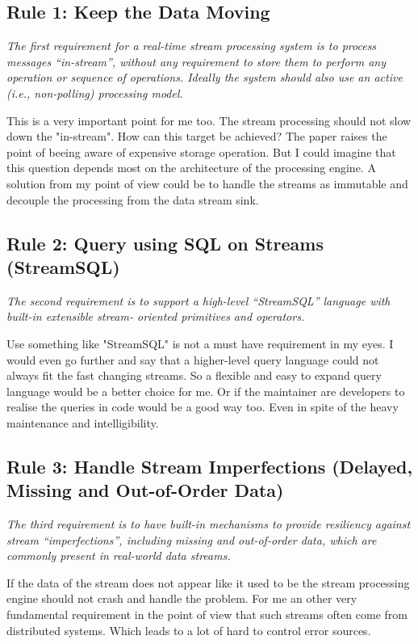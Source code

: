 \subsection{Rule 1: Keep the Data Moving}
\textit{The first requirement for a real-time stream processing
        system is to process messages “in-stream”, without any
        requirement to store them to perform any operation or
        sequence of operations. Ideally the system should also use
        an active (i.e., non-polling) processing model.}

\medskip
This is a very important point for me too. The stream processing should not slow down the "in-stream".
How can this target be achieved? The paper raises the point of beeing  aware of expensive storage operation.
But I could imagine that this question depends most on the architecture of the processing engine.
A solution from my point of view could be to handle the streams as immutable and decouple the processing from the data stream sink.


\subsection{Rule 2: Query using SQL on Streams (StreamSQL)}
\textit{The second requirement is to support a high-level
        “StreamSQL” language with built-in extensible stream-
        oriented primitives and operators.}

\medskip
Use something like "StreamSQL" is not a must have requirement in my eyes.
I would even go further and say that a higher-level query language could not always fit the fast changing streams.
So a flexible and easy to expand query language would be a better choice for me.
Or if the maintainer are developers to realise the queries in code would be a good way too.
Even in spite of the heavy maintenance and intelligibility.

\newpage
\subsection{Rule 3: Handle Stream Imperfections (Delayed, Missing
and Out-of-Order Data)}
\textit{The third requirement is to have built-in mechanisms to
        provide resiliency against stream “imperfections”,
        including missing and out-of-order data, which are
        commonly present in real-world data streams.}

\medskip
If the data of the stream does not appear like it used to be the stream processing engine should not crash and handle the problem.
For me an other very fundamental requirement in the point of view that such streams often come from distributed systems.
Which leads to a lot of hard to control error sources.

